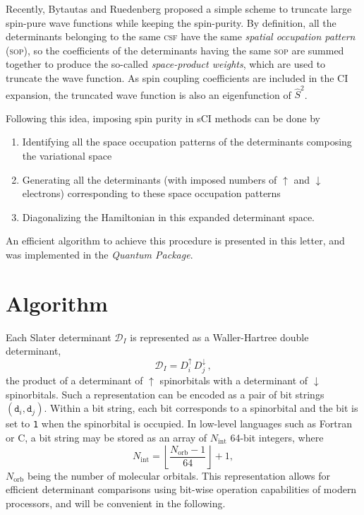 \documentclass[aip,jcp,reprint,showkeys]{revtex4-1}
\newcommand{\stwo}{\hat{S}^2}
\newcommand{\md}{\mathtt{d}}
\newcommand{\mD}{\mathcal{D}}
\newcommand{\up}{\uparrow}
\newcommand{\dn}{\downarrow}
\newcommand{\Nint}{{N_\text{int}}}
\newcommand{\Norb}{{N_\text{orb}}}
\newcommand{\one}{{\texttt{1}}}
\newcommand{\sop}{\textsc{sop}}
\newcommand{\csf}{\textsc{csf}}
\begin{document}
Recently, Bytautas and Ruedenberg proposed a simple scheme to truncate large
spin-pure wave functions while keeping the spin-purity.\cite{Bytautas_2007}
By definition, all the determinants belonging to the same {\csf} have the same
\emph{spatial occupation pattern} (\sop), so the
coefficients of the determinants having the same {\sop}
are summed together to produce the so-called \emph{space-product
weights}, which are used to truncate the wave function. As spin coupling
coefficients are included in the CI expansion, the truncated wave function is
also an eigenfunction of $\stwo$.

Following this idea, imposing spin purity in sCI methods can be done by 
\begin{enumerate}
\item Identifying all the space occupation patterns of the determinants composing
      the variational space
\item Generating all the determinants (with imposed numbers of $\up$ and
      $\dn$ electrons) corresponding to these space occupation patterns
\item Diagonalizing the Hamiltonian in this expanded determinant space.
\end{enumerate}
An efficient algorithm to achieve this procedure is presented in this letter,
and was implemented in the \emph{Quantum Package}.\cite{qp}


\section{Algorithm}

Each Slater determinant $\mD_I$ is represented as a Waller-Hartree double
determinant,\cite{Pauncz_1989}
\begin{equation}
 \label{eq:di}
 \mD_I = D_i^\up \, D_j^\dn\, ,
\end{equation}
the product of a determinant of
$\up$ spinorbitals with a determinant of $\dn$ spinorbitals.
Such a representation can be encoded as a pair of bit strings $(\md_i,\md_j)$.
Within a bit string,
each bit corresponds to a spinorbital and the bit is set to \one{} when the
spinorbital is occupied. In low-level languages such as Fortran or C, a bit
string may be stored as an array of $\Nint$ 64-bit integers, where 
\begin{equation}
  \Nint = \left \lfloor \frac{\Norb-1}{64} \right \rfloor + 1,
\end{equation}
$\Norb$ being the number of molecular orbitals.
This representation
allows for efficient determinant comparisons using bit-wise operation 
capabilities of modern processors,\cite{Scemama_2013} and will be convenient
in the following.
\end{document}
